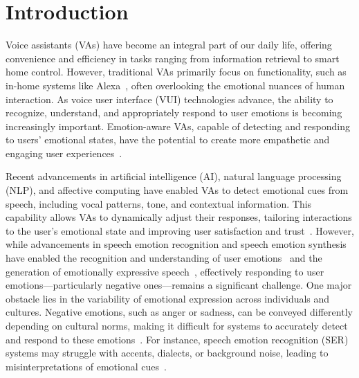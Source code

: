 \section{Introduction}
Voice assistants (VAs) have become an integral part of our daily life, offering convenience and efficiency in tasks ranging from information retrieval to smart home control. However, traditional VAs primarily focus on functionality, such as in-home systems like Alexa~\cite{mclean2019hey,hoy2018alexa}, often overlooking the emotional nuances of human interaction. As voice user interface (VUI) technologies advance, the ability to recognize, understand, and appropriately respond to user emotions is becoming increasingly important.
Emotion-aware VAs, capable of detecting and responding to users' emotional states, have the potential to create more empathetic and engaging user experiences~\cite{ma2023emotion,kossack2023emotion}.

Recent advancements in artificial intelligence (AI), natural language processing (NLP), and affective computing have enabled VAs to detect emotional cues from speech, including vocal patterns, tone, and contextual information. This capability allows VAs to dynamically adjust their responses, tailoring interactions to the user's emotional state and improving user satisfaction and trust~\cite{ma2022should,Parvathi2025voice}.
However, while advancements in speech emotion recognition and speech emotion synthesis have enabled the recognition and understanding of user emotions~\cite{wani2021comprehensive} and the generation of emotionally expressive speech~\cite{triantafyllopoulos2023overview}, effectively responding to user emotions—particularly negative ones—remains a significant challenge.
One major obstacle lies in the variability of emotional expression across individuals and cultures. Negative emotions, such as anger or sadness, can be conveyed differently depending on cultural norms, making it difficult for systems to accurately detect and respond to these emotions~\cite{mesquita1992cultural}. For instance, speech emotion recognition (SER) systems may struggle with accents, dialects, or background noise, leading to misinterpretations of emotional cues~\cite{can2023approaches}.  

